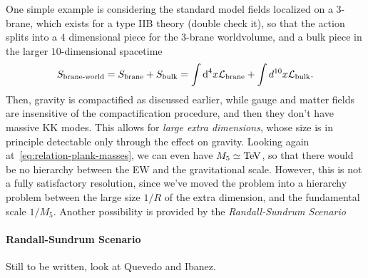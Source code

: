 One simple example is considering the standard model fields localized on a $3$-brane, which exists for a type IIB theory (double check it), so that the action splits into a $4$ dimensional piece for the $3$-brane worldvolume, and a bulk piece in the larger $10$-dimensional spacetime
\begin{equation}
    S_\textup{brane-world} = S_\textup{brane} + S_\textup{bulk} = \int {\mathop{}\!\mathrm{d}}^4 x \mathcal{L}_\textup{brane} + \int d^{10} x \mathcal{L}_\textup{bulk} .
\end{equation}
Then, gravity is compactified as discussed earlier, while gauge and matter fields are insensitive of the compactification procedure, and then they don't have massive KK modes. This allows for \emph{large extra dimensions}, whose size is in principle detectable only through the effect on gravity. Looking again at~\eqref{eq:relation-plank-masses}, we can even have $M_5 \simeq \textup{TeV}$, so that there would be no hierarchy between the EW and the gravitational scale. However, this is not a fully satisfactory resolution, since we've moved the problem into a hierarchy problem between the large size $1/R$ of the extra dimension, and the fundamental scale $1/M_5$. Another possibility is provided by the \emph{Randall-Sundrum Scenario}

\paragraph{Randall-Sundrum Scenario}
Still to be written, look at Quevedo and Ibanez.